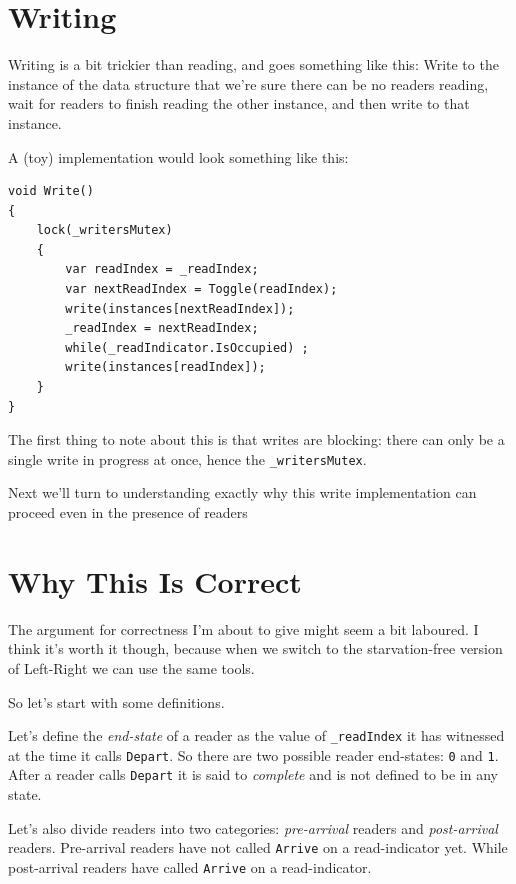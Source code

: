 \documentclass[11pt]{article}
\begin{document}
\section{Writing}

Writing is a bit trickier than reading, and goes something like this: Write to the instance of the data structure that we're sure there can be no readers reading, wait for readers to finish reading the other instance, and then write to that instance.

A (toy) implementation would look something like this:

\begin{lstlisting}
void Write()
{
    lock(_writersMutex)
    {
        var readIndex = _readIndex;
        var nextReadIndex = Toggle(readIndex);
        write(instances[nextReadIndex]);
        _readIndex = nextReadIndex;
        while(_readIndicator.IsOccupied) ;
        write(instances[readIndex]);
    }
}
\end{lstlisting}

The first thing to note about this is that writes are blocking: there can only be a single write in progress at once, hence the \texttt{\_writersMutex}.

Next we'll turn to understanding exactly why this write implementation can proceed even in the presence of readers 

\section{Why This Is Correct}

The argument for correctness I'm about to give might seem a bit laboured. I think it's worth it though, because when we switch to the starvation-free version of Left-Right we can use the same tools.

So let's start with some definitions.

Let's define the \emph{end-state} of a reader as the value of \texttt{\_readIndex} it has witnessed at the time it calls \texttt{Depart}. So there are two possible reader end-states: \texttt{0} and \texttt{1}. After a reader calls \texttt{Depart} it is said to \emph{complete} and is not defined to be in any state.

Let's also divide readers into two categories: \emph{pre-arrival} readers and \emph{post-arrival} readers. Pre-arrival readers have not called \texttt{Arrive} on a read-indicator yet. While post-arrival readers have called \texttt{Arrive} on a read-indicator.
\end{document}
